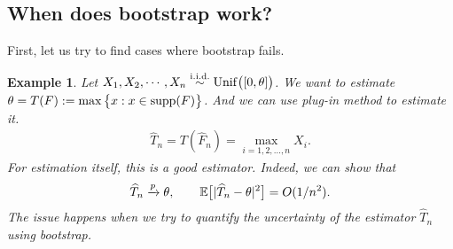 \documentclass[11pt,letterpaper]{article}
\numberwithin{assumption}{lecture}
\newtheorem{example}{Example}
\numberwithin{theorem}{lecture}
\numberwithin{proposition}{lecture}
\numberwithin{lemma}{lecture}
\numberwithin{claim}{lecture}
\numberwithin{corollary}{lecture}
\numberwithin{definition}{lecture}
\numberwithin{conjecture}{lecture}
\numberwithin{remark}{lecture}
\numberwithin{example}{lecture}
\numberwithin{equation}{lecture}
\begin{document}
\subsection{When does bootstrap work?}
First, let us try to find cases where bootstrap fails.
\begin{example}\upshape
  Let $X_1, X_2, \cdots, X_n \overset{\mathrm{i.i.d.}}{\sim} \mathrm{Unif} \big( [0 , \theta] \big)$. We want to estimate $\theta = T(F) := \max \big\{ x: x \in \mathrm{supp} (F)\big\}$. And we can use plug-in method to estimate it.
  \begin{align*}
    \widehat{T}_n = T(\widehat{F}_n) = \max_{i=1, 2, \ldots, n} X_i.
  \end{align*}
  For estimation itself, this is a good estimator. Indeed, we can show that
  \begin{align*}
    \widehat{T}_n \xrightarrow{p} \theta, \qquad {\mathbb{E}} \big[ |\widehat{T}_n - \theta|^2 \big] = O(1/n^2).
  \end{align*}
  The issue happens when we try to quantify the uncertainty of the estimator $\widehat{T}_n$ using bootstrap.


\end{example}
\end{document}
